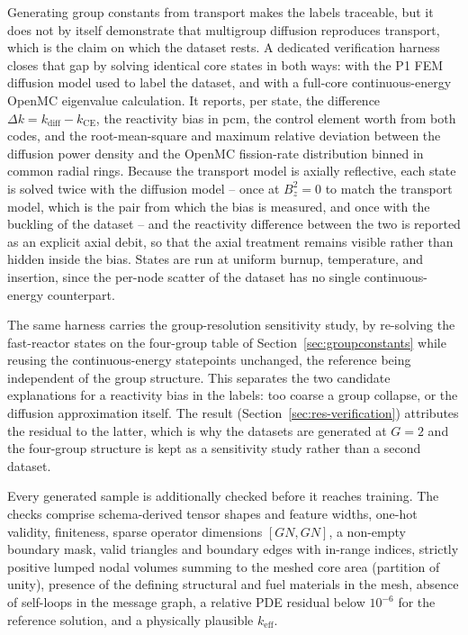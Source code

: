 \documentclass[preprint,12pt]{elsarticle}
\newcommand{\keff}{k_{\mathrm{eff}}}
\newcommand{\Bz}{B_z^{2}}
\begin{document}
Generating group constants from transport makes the labels traceable, but it
does not by itself demonstrate that multigroup diffusion reproduces transport,
which is the claim on which the dataset rests. A dedicated verification harness
closes that gap by solving identical core states in both ways: with the P1 FEM
diffusion model used to label the dataset, and with a full-core
continuous-energy OpenMC eigenvalue calculation. It reports, per state, the
difference $\Delta k = k_{\mathrm{diff}} - k_{\mathrm{CE}}$, the reactivity bias
in pcm, the control element worth from both codes, and the root-mean-square and
maximum relative deviation between the diffusion power density and the OpenMC
fission-rate distribution binned in common radial rings. Because the transport
model is axially reflective, each state is solved twice with the diffusion
model -- once at $\Bz=0$ to match the transport model, which is the pair from
which the bias is measured, and once with the buckling of the dataset -- and the
reactivity difference between the two is reported as an explicit axial debit, so
that the axial treatment remains visible rather than hidden inside the bias.
States are run at uniform burnup, temperature, and insertion, since the per-node
scatter of the dataset has no single continuous-energy counterpart.

The same harness carries the group-resolution sensitivity study, by re-solving
the fast-reactor states on the four-group table of
Section~\ref{sec:groupconstants} while reusing the continuous-energy statepoints
unchanged, the reference being independent of the group structure. This
separates the two candidate explanations for a reactivity bias in the labels:
too coarse a group collapse, or the diffusion approximation itself. The result
(Section~\ref{sec:res-verification}) attributes the residual to the latter, which
is why the datasets are generated at $G=2$ and the four-group structure is kept
as a sensitivity study rather than a second dataset.

Every generated sample is additionally checked before it reaches training.
The checks comprise schema-derived tensor shapes and feature widths, one-hot
validity, finiteness, sparse operator dimensions $[GN,GN]$, a non-empty boundary
mask, valid triangles and boundary edges with in-range indices, strictly
positive lumped nodal volumes summing to the meshed core area (partition of
unity), presence of the defining structural and fuel materials in the mesh,
absence of self-loops in the message graph, a relative PDE residual below
$10^{-6}$ for the reference solution, and a physically plausible $\keff$.
\end{document}
